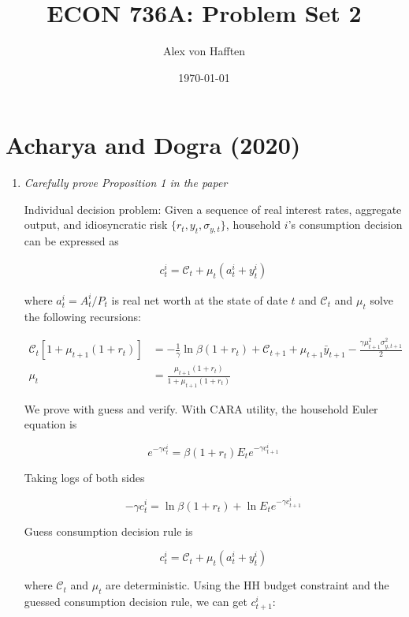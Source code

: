 \documentclass{article}
\title{ECON 736A: Problem Set 2}
\author{Alex von Hafften}
\date{\today}
\newcommand{\C}{\mathcal{C}}
\newenvironment{manualtheorem}[1]{%
  \renewcommand\themanualtheoreminner{#1}%
  \manualtheoreminner
}{\endmanualtheoreminner}
\begin{document}
\maketitle

\section{Acharya and Dogra (2020)}

\begin{enumerate}

\item \textit{Carefully prove Proposition 1 in the paper}

\begin{manualtheorem}{1} 

Individual decision problem: Given a sequence of real interest rates, aggregate output, and idiosyncratic risk $\{r_t, y_t, \sigma_{y, t}\}$, household $i$'s consumption decision can be expressed as

\begin{align}
c_t^i = \C_t + \mu_t (a_t^i + y_t^i)
\end{align}

where $a_t^i = A_t^i / P_t$ is real net worth at the state of date $t$ and $\C_t$ and $\mu_t$ solve the following recursions:

\begin{align}
\C_t [1 + \mu_{t+1} (1 + r_t)] &= - \frac{1}{\gamma} \ln \beta (1 +r_t) + \C_{t+1} + \mu_{t+1} \bar y_{t+1} - \frac{\gamma \mu_{t+1}^2 \sigma_{y,t+1}^2}{2}\\
\mu_t &= \frac{\mu_{t+1}(1+r_t)}{1 + \mu_{t+1} (1+r_t)}
\end{align}

\end{manualtheorem}

\bigskip

We prove with guess and verify. With CARA utility, the household Euler equation is

$$
e^{-\gamma c_t^i} = \beta (1 + r_t) E_t e^{-\gamma c_{t+1}^i}
$$

Taking logs of both sides

$$
-\gamma c_t^i = \ln \beta (1 + r_t) + \ln E_t e^{-\gamma c_{t+1}^i}
$$

Guess consumption decision rule is 

$$
c_t^i = \C_t + \mu_t (a_t^i + y_t^i)
$$

where $\C_t$ and $\mu_t$ are deterministic. Using the HH budget constraint and the guessed consumption decision rule, we can get $c_{t+1}^i$:


\end{enumerate}
\end{document}
